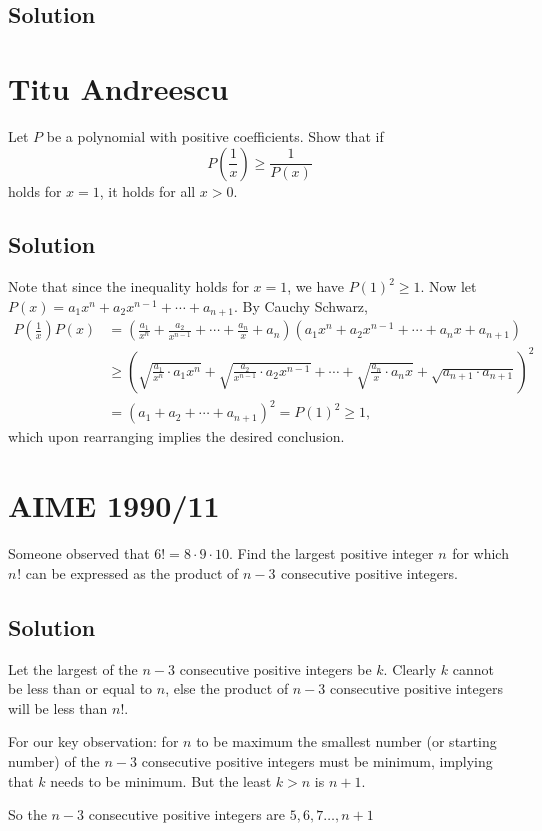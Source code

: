 \documentclass[mast]{lucky}
\begin{document}
\subsection{Solution}


\pagebreak\section{Titu Andreescu}
Let $P$ be a polynomial with positive coefficients. Show that if \[P\left(\frac1x\right)\ge \frac1{P(x)}\] holds for $x=1$, it holds for all $x>0$.
\subsection{Solution}
Note that since the inequality holds for $x=1$, we have $P(1)^2 \geq 1$. Now let $P(x)=a_1x^{n}+a_2x^{n-1}+\cdots+a_{n+1}.$ By Cauchy Schwarz,
\begin{align*}
P\left(\frac1x\right)P(x)&=(\tfrac{a_1}{x^n}+\tfrac{a_2}{x^{n-1}}+\cdots+\tfrac{a_n}{x}+a_n)(a_1x^n+a_2x^{n-1}+\cdots+a_nx+a_{n+1})\\
&\ge (\sqrt{\tfrac{a_1}{x^n}\cdot a_1x^n}+\sqrt{\tfrac{a_2}{x^{n-1}}\cdot a_2x^{n-1}}+\cdots+\sqrt{\tfrac{a_n}{x}\cdot a_nx}+\sqrt{a_{n+1}\cdot a_{n+1}})^2\\
&=(a_1+a_2+\cdots+a_{n+1})^2=P(1)^2\geq 1,
\end{align*}
which upon rearranging implies the desired conclusion.
\pagebreak\section{AIME 1990/11}
Someone observed that $6! = 8 \cdot 9 \cdot 10$. Find the largest positive integer $n^{}_{}$ for which $n^{}_{}!$ can be expressed as the product of $n - 3_{}^{}$ consecutive positive integers.
\subsection{Solution}
Let the largest of the $n-3$ consecutive positive integers be $k$. Clearly $k$ cannot be less than or equal to $n$, else the product of $n-3$ consecutive positive integers will be less than $n!$.

For our key observation: for $n$ to be maximum the smallest number (or starting number) of the $n-3$ consecutive positive integers must be minimum, implying that $k$ needs to be minimum. But the least $k > n$ is $n+1$.

So the $n-3$ consecutive positive integers are $5, 6, 7…, n+1$
\end{document}
